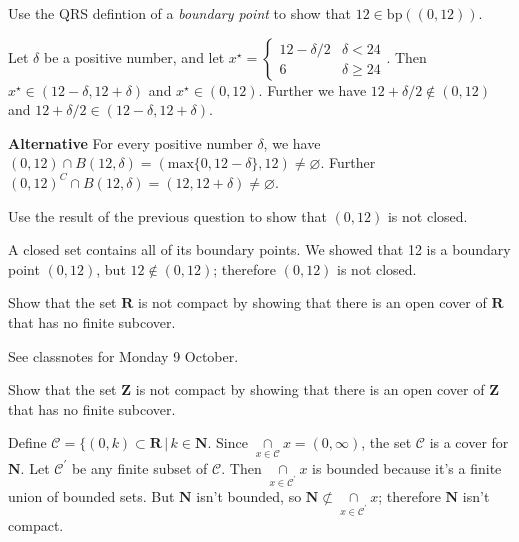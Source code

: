 \documentclass[12pt, fleqn, answers]{exam}
\newcommand{\reals}{\mathbf{R}}
\newcommand{\bp}{\mathrm{bp}}
\begin{document}
\begin{questions}
\begin{solution}%

\end{solution}

\question  Use the QRS defintion of a \emph{boundary point} to show that $12 \in \bp((0,12))$.


\begin{solution}%
Let \(\delta\) be a positive number, and let \(x^\star = \begin{cases} 12 - \delta/2 & \delta < 24 \\
                                                                      6  & \delta \geq 24 
\end{cases}\). Then \(x^\star \in (12-\delta, 12+ \delta)\) and \(x^\star \in (0,12)\). Further
we have \(12 + \delta /2 \notin (0,12)\) and \(12 + \delta/2 \in (12-\delta, 12+ \delta)\).

\textbf{Alternative} For every positive number \(\delta\), we have
\( (0,12) \cap B(12, \delta)  = (\mbox{max} \{0, 12 - \delta \}, 12) \neq \varnothing\). 
Further \( (0,12)^C \cap B(12, \delta)  = (12, 12 + \delta) \neq \varnothing\). 

\end{solution}

\question  Use the result of the previous question to show that \((0,12)\) is not
closed.

\begin{solution}%
A closed set contains all of its boundary points. We showed that 12 is a boundary point \((0,12)\), but
\(12 \notin (0,12)\); therefore \((0,12)\) is not closed.
\end{solution}


\question  Show that the set \(\reals\) is not compact by 
showing that there is an open cover of \( \reals \) that has no
finite subcover.

\begin{solution} See classnotes for Monday 9 October.

\end{solution}

\question  Show that the set \(\mathbf{Z}\) is not compact by 
showing that there is an open cover of \( \mathbf{Z} \) that has no
finite subcover.

\begin{solution}%
  Define \(\mathcal{C} = \{(0,k) \subset \reals \, | \, k \in \mathbf{N}\). Since 
  \(\underset{x \in \mathcal{C}}{\cap} x = (0,\infty)\), the set \(\mathcal{C}\)
is a cover for  \(\mathbf{N}\). Let  \(\mathcal{C}^\prime\) be any finite subset
of  \(\mathcal{C}\). Then \(\underset{x \in \mathcal{C}^\prime}{\cap} x\) is
bounded because it's a finite union of bounded sets.  But \(\mathbf{N}\) isn't
bounded, so \(\mathbf{N} \not \subset \underset{x \in \mathcal{C}^\prime}{\cap} x\);
therefore \(\mathbf{N}\) isn't compact.
\end{solution}


\end{questions}
\end{document}
